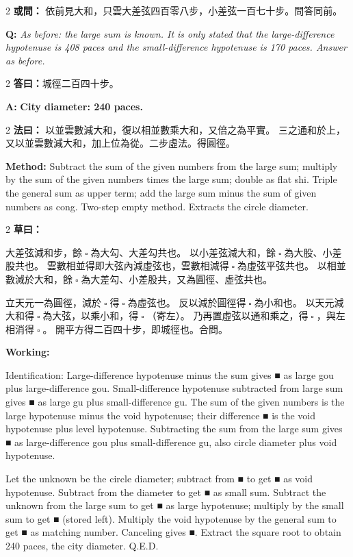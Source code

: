 \documentclass[11pt,a4paper]{article}
\let\origsquare\square
\renewcommand{\square}{\ensuremath{\origsquare}}%
\newcommand{\owen}[1]{%
  \noindent\textcolor{problemcolor}{\textbf{或問：}}{\tradfont #1}\par\nopagebreak%
}
\newcommand{\oweneng}[1]{%
  \noindent\textcolor{engcolor}{\textbf{Q: }}{\itshape #1}\par\nopagebreak%
}
\newcommand{\fayue}[1]{%
  \noindent\textcolor{methodcolor}{\textbf{法曰：}}{\tradfont #1}\par\nopagebreak%
}
\newcommand{\fayueeng}[1]{%
  \noindent\textcolor{engcolor}{\textbf{Method: }}{#1}\par\nopagebreak%
}
\newcommand{\tsaoyue}[1]{%
  \noindent\textcolor{workcolor}{\textbf{草曰：}}{\tradfont #1}\par%
}
\newcommand{\tsaoyueeng}[1]{%
  \noindent\textcolor{engcolor}{\textbf{Working: }}{\small #1}\par%
}
\newcommand{\dayue}[1]{%
  \noindent\textcolor{anscolor}{\textbf{答曰：}}{\tradfont #1}\par\nopagebreak%
}
\newcommand{\dayueeng}[1]{%
  \noindent\textcolor{engcolor}{\textbf{A: }}{\bfseries #1}\par\nopagebreak%
}
\begin{document}
\begin{paracol}{2}
\owen{%
依前見大和，只雲大差弦四百零八步，小差弦一百七十步。問答同前。}
\switchcolumn
\oweneng{%
As before: the large sum is known. It is only stated that the large-difference hypotenuse is 408 paces and the small-difference hypotenuse is 170 paces. Answer as before.}
\end{paracol}

\begin{paracol}{2}
\dayue{城徑二百四十步。}
\switchcolumn
\dayueeng{City diameter: 240 paces.}
\end{paracol}

\begin{paracol}{2}
\fayue{%
以並雲數減大和，復以相並數乘大和，又倍之為平實。
三之通和於上，又以並雲數減大和，加上位為從。二步虛法。得圓徑。}
\switchcolumn
\fayueeng{%
Subtract the sum of the given numbers from the large sum; multiply by the sum of the given numbers times the large sum; double as flat shi. Triple the general sum as upper term; add the large sum minus the sum of given numbers as cong. Two-step empty method. Extracts the circle diameter.}
\end{paracol}

\begin{paracol}{2}
\tsaoyue{%
大差弦減和步，餘$ \; \square \; $為大勾、大差勾共也。
以小差弦減大和，餘$ \; \square \; $為大股、小差股共也。
雲數相並得即大弦內減虛弦也，雲數相減得$ \; \square \; $為虛弦平弦共也。
以相並數減於大和，餘$ \; \square \; $為大差勾、小差股共，又為圓徑、虛弦共也。

立天元一為圓徑，減於$ \; \square \; $得$ \; \square \; $為虛弦也。
反以減於圓徑得$ \; \square \; $為小和也。
以天元減大和得$ \; \square \; $為大弦，以乘小和，得$ \; \square \; $（寄左）。
乃再置虛弦以通和乘之，得$ \; \square \; $，與左相消得$ \; \square \; $。
開平方得二百四十步，即城徑也。合問。}
\switchcolumn
\tsaoyueeng{%
Identification: Large-difference hypotenuse minus the sum gives ■ as large gou plus large-difference gou. Small-difference hypotenuse subtracted from large sum gives ■ as large gu plus small-difference gu. The sum of the given numbers is the large hypotenuse minus the void hypotenuse; their difference ■ is the void hypotenuse plus level hypotenuse. Subtracting the sum from the large sum gives ■ as large-difference gou plus small-difference gu, also circle diameter plus void hypotenuse.

Let the unknown be the circle diameter; subtract from ■ to get ■ as void hypotenuse. Subtract from the diameter to get ■ as small sum. Subtract the unknown from the large sum to get ■ as large hypotenuse; multiply by the small sum to get ■ (stored left). Multiply the void hypotenuse by the general sum to get ■ as matching number. Canceling gives ■. Extract the square root to obtain 240 paces, the city diameter. Q.E.D.}
\end{paracol}
\end{document}
